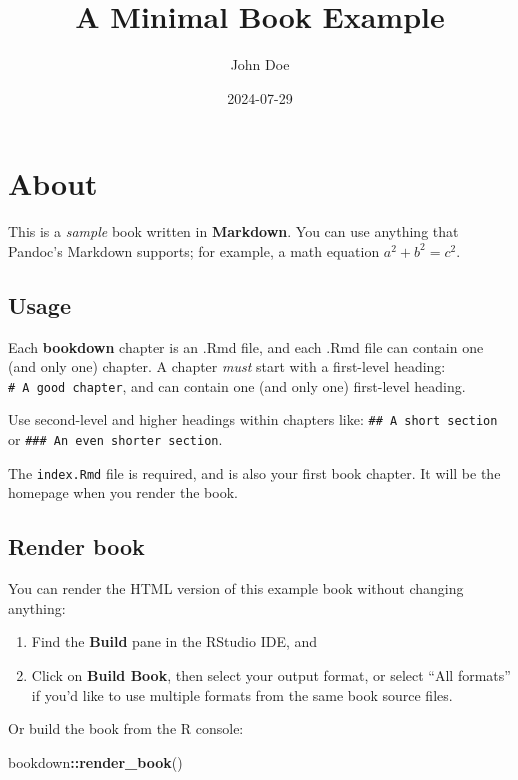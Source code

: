 \documentclass[
]{book}
\title{A Minimal Book Example}
\author{John Doe}
\date{2024-07-29}
\newenvironment{Shaded}{\begin{snugshade}}{\end{snugshade}}
\newcommand{\FunctionTok}[1]{\textcolor[rgb]{0.13,0.29,0.53}{\textbf{#1}}}
\newcommand{\NormalTok}[1]{#1}
\newcommand{\SpecialCharTok}[1]{\textcolor[rgb]{0.81,0.36,0.00}{\textbf{#1}}}
\theoremstyle{definition}
\theoremstyle{definition}
\theoremstyle{definition}
\theoremstyle{definition}
\theoremstyle{remark}
\begin{document}
\maketitle

{
\setcounter{tocdepth}{1}
\tableofcontents
}
\hypertarget{about}{%
\chapter{About}\label{about}}

This is a \emph{sample} book written in \textbf{Markdown}. You can use anything that Pandoc's Markdown supports; for example, a math equation \(a^2 + b^2 = c^2\).

\hypertarget{usage}{%
\section{Usage}\label{usage}}

Each \textbf{bookdown} chapter is an .Rmd file, and each .Rmd file can contain one (and only one) chapter. A chapter \emph{must} start with a first-level heading: \texttt{\#\ A\ good\ chapter}, and can contain one (and only one) first-level heading.

Use second-level and higher headings within chapters like: \texttt{\#\#\ A\ short\ section} or \texttt{\#\#\#\ An\ even\ shorter\ section}.

The \texttt{index.Rmd} file is required, and is also your first book chapter. It will be the homepage when you render the book.

\hypertarget{render-book}{%
\section{Render book}\label{render-book}}

You can render the HTML version of this example book without changing anything:

\begin{enumerate}
\def\labelenumi{\arabic{enumi}.}
\item
  Find the \textbf{Build} pane in the RStudio IDE, and
\item
  Click on \textbf{Build Book}, then select your output format, or select ``All formats'' if you'd like to use multiple formats from the same book source files.
\end{enumerate}

Or build the book from the R console:

\begin{Shaded}
\begin{Highlighting}[]
\NormalTok{bookdown}\SpecialCharTok{::}\FunctionTok{render\_book}\NormalTok{()}
\end{Highlighting}
\end{Shaded}
\end{document}
